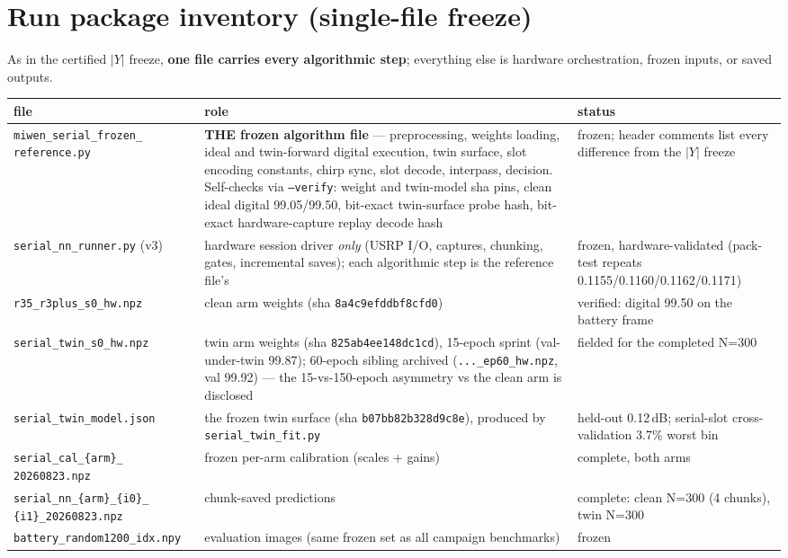 \documentclass[11pt]{article}
\begin{document}
\section{Run package inventory (single-file freeze)}
As in the certified $|Y|$ freeze, \textbf{one file carries every
algorithmic step}; everything else is hardware orchestration, frozen
inputs, or saved outputs.
\begin{center}\small
\begin{tabular}{p{4.3cm}p{5.6cm}p{5.2cm}}
\toprule
file & role & status\\
\midrule
\texttt{miwen\_serial\_frozen\_ reference.py} & \textbf{THE frozen
algorithm file} --- preprocessing, weights loading, ideal and
twin-forward digital execution, twin surface, slot encoding
constants, chirp sync, slot decode, interpass, decision. Self-checks
via \texttt{--verify}: weight and twin-model sha pins, clean ideal
digital 99.05/99.50, bit-exact twin-surface probe hash, bit-exact
hardware-capture replay decode hash & frozen; header comments list
every difference from the $|Y|$ freeze\\
\texttt{serial\_nn\_runner.py} (v3) & hardware session driver
\emph{only} (USRP I/O, captures, chunking, gates, incremental
saves); each algorithmic step is the reference file's & frozen,
hardware-validated (pack-test repeats 0.1155/0.1160/0.1162/0.1171)\\
\texttt{r35\_r3plus\_s0\_hw.npz} & clean arm weights
(sha \texttt{8a4c9efddbf8cfd0}) & verified: digital 99.50 on the
battery frame\\
\texttt{serial\_twin\_s0\_hw.npz} & twin arm weights (sha
\texttt{825ab4ee148dc1cd}), 15-epoch sprint (val-under-twin 99.87);
60-epoch sibling archived (\texttt{...\_ep60\_hw.npz},
val 99.92) --- the 15-vs-150-epoch asymmetry vs the clean arm is
disclosed & fielded for the completed N=300\\
\texttt{serial\_twin\_model.json} & the frozen twin surface (sha
\texttt{b07bb82b328d9c8e}), produced by
\texttt{serial\_twin\_fit.py} & held-out 0.12\,dB; serial-slot
cross-validation 3.7\% worst bin\\
\texttt{serial\_cal\_\{arm\}\_ 20260823.npz} & frozen per-arm
calibration (scales + gains) & complete, both arms\\
\texttt{serial\_nn\_\{arm\}\_\{i0\}\_ \{i1\}\_20260823.npz} &
chunk-saved predictions & complete: clean N=300 (4 chunks), twin
N=300\\
\texttt{battery\_random1200\_idx.npy} & evaluation images (same
frozen set as all campaign benchmarks) & frozen\\
\bottomrule
\end{tabular}
\end{center}
\end{document}
